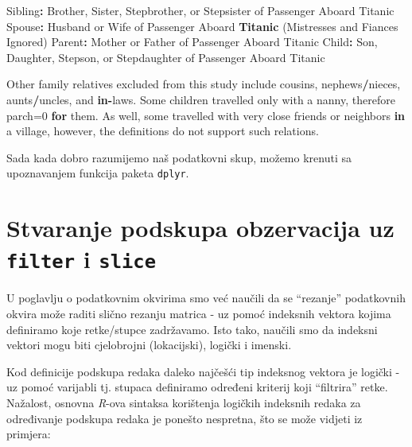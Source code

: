 \documentclass[]{book}
\newenvironment{Shaded}{\begin{snugshade}}{\end{snugshade}}
\newcommand{\KeywordTok}[1]{\textcolor[rgb]{0.13,0.29,0.53}{\textbf{#1}}}
\newcommand{\DecValTok}[1]{\textcolor[rgb]{0.00,0.00,0.81}{#1}}
\newcommand{\StringTok}[1]{\textcolor[rgb]{0.31,0.60,0.02}{#1}}
\newcommand{\ControlFlowTok}[1]{\textcolor[rgb]{0.13,0.29,0.53}{\textbf{#1}}}
\newcommand{\OperatorTok}[1]{\textcolor[rgb]{0.81,0.36,0.00}{\textbf{#1}}}
\newcommand{\NormalTok}[1]{#1}
\theoremstyle{definition}
\theoremstyle{definition}
\theoremstyle{definition}
\theoremstyle{remark}
\begin{document}
\begin{Shaded}
\begin{Highlighting}[]
\NormalTok{Sibling}\OperatorTok{:}\StringTok{  }\NormalTok{Brother, Sister, Stepbrother, or Stepsister of Passenger Aboard Titanic}
\NormalTok{Spouse}\OperatorTok{:}\StringTok{   }\NormalTok{Husband or Wife of Passenger Aboard }\KeywordTok{Titanic}\NormalTok{ (Mistresses and Fiances Ignored)}
\NormalTok{Parent}\OperatorTok{:}\StringTok{   }\NormalTok{Mother or Father of Passenger Aboard Titanic}
\NormalTok{Child}\OperatorTok{:}\StringTok{    }\NormalTok{Son, Daughter, Stepson, or Stepdaughter of Passenger Aboard Titanic}

\NormalTok{Other family relatives excluded from this study include cousins,}
\NormalTok{nephews}\OperatorTok{/}\NormalTok{nieces, aunts}\OperatorTok{/}\NormalTok{uncles, and }\ControlFlowTok{in}\OperatorTok{-}\NormalTok{laws.  Some children travelled}
\NormalTok{only with a nanny, therefore parch=}\DecValTok{0} \ControlFlowTok{for}\NormalTok{ them.  As well, some}
\NormalTok{travelled with very close friends or neighbors }\ControlFlowTok{in}\NormalTok{ a village, however,}
\NormalTok{the definitions do not support such relations.}
\end{Highlighting}
\end{Shaded}

Sada kada dobro razumijemo naš podatkovni skup, možemo krenuti sa
upoznavanjem funkcija paketa \texttt{dplyr}.

\section{\texorpdfstring{Stvaranje podskupa obzervacija uz
\texttt{filter} i
\texttt{slice}}{Stvaranje podskupa obzervacija uz filter i slice}}\label{stvaranje-podskupa-obzervacija-uz-filter-i-slice}

U poglavlju o podatkovnim okvirima smo već naučili da se ``rezanje''
podatkovnih okvira može raditi slično rezanju matrica - uz pomoć
indeksnih vektora kojima definiramo koje retke/stupce zadržavamo. Isto
tako, naučili smo da indeksni vektori mogu biti cjelobrojni
(lokacijski), logički i imenski.

Kod definicije podskupa redaka daleko najčešći tip indeksnog vektora je
logički - uz pomoć varijabli tj. stupaca definiramo određeni kriterij
koji ``filtrira'' retke. Nažalost, osnovna \emph{R}-ova sintaksa
korištenja logičkih indeksnih redaka za određivanje podskupa redaka je
ponešto nespretna, što se može vidjeti iz primjera:

\begin{Shaded}
\end{Shaded}
\end{document}

